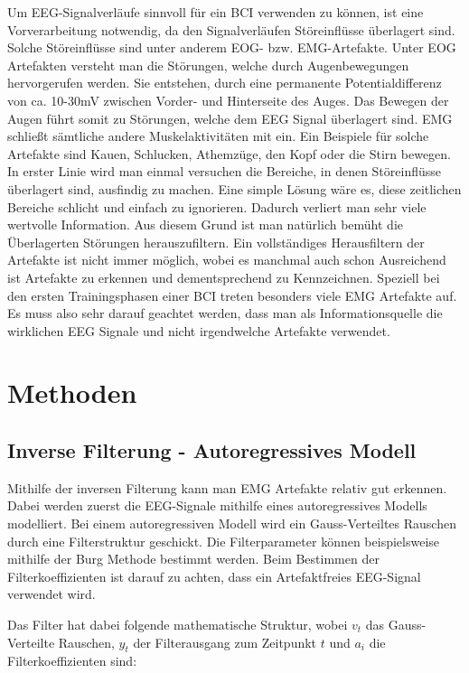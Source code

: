 \documentclass[preprint,12pt]{elsarticle}
\begin{document}
Um EEG-Signalverläufe sinnvoll für ein BCI verwenden zu können, ist eine Vorverarbeitung notwendig, da 
den Signalverläufen Störeinflüsse überlagert sind.
Solche Störeinflüsse sind unter anderem EOG- bzw. EMG-Artefakte. 
Unter EOG Artefakten versteht man die Störungen, welche durch Augenbewegungen hervorgerufen werden.
Sie entstehen, durch eine permanente Potentialdifferenz von ca. 10-30mV zwischen Vorder- und Hinterseite
des Auges. \cite{Chen2004} Das Bewegen der Augen führt somit zu Störungen, welche dem EEG Signal überlagert sind.
EMG schließt sämtliche andere Muskelaktivitäten mit ein. Ein Beispiele für solche Artefakte sind
Kauen, Schlucken, Athemzüge, den Kopf oder die Stirn bewegen.
In erster Linie wird man einmal versuchen die Bereiche, in denen Störeinflüsse überlagert sind, ausfindig zu machen.
Eine simple Lösung wäre es, diese zeitlichen Bereiche schlicht und einfach zu ignorieren. Dadurch verliert man
sehr viele wertvolle Information. Aus diesem Grund ist man natürlich bemüht die Überlagerten Störungen herauszufiltern.
Ein vollständiges Herausfiltern der Artefakte ist nicht immer möglich,
wobei es manchmal auch schon Ausreichend ist Artefakte zu erkennen und dementsprechend zu Kennzeichnen.
Speziell bei den ersten Trainingsphasen einer BCI treten besonders viele EMG Artefakte auf. Es muss also sehr darauf
geachtet werden, dass man als Informationsquelle die wirklichen EEG Signale und nicht irgendwelche Artefakte verwendet.
~\cite{Pfurtscheller2007}

\section{Methoden}

\subsection{Inverse Filterung - Autoregressives Modell}

Mithilfe der inversen Filterung kann man EMG Artefakte relativ gut erkennen. Dabei werden zuerst die EEG-Signale
mithilfe eines autoregressives Modells modelliert. Bei einem autoregressiven Modell wird ein Gauss-Verteiltes
Rauschen durch eine Filterstruktur geschickt. Die Filterparameter können beispielsweise mithilfe der Burg Methode
bestimmt werden. Beim Bestimmen der Filterkoeffizienten ist darauf zu achten, dass ein Artefaktfreies EEG-Signal
verwendet wird.

Das Filter hat dabei folgende mathematische Struktur, wobei $v_t$ das Gauss-Verteilte Rauschen, $y_t$ der
Filterausgang zum Zeitpunkt $t$ und $a_i$ die Filterkoeffizienten sind:
\end{document}
